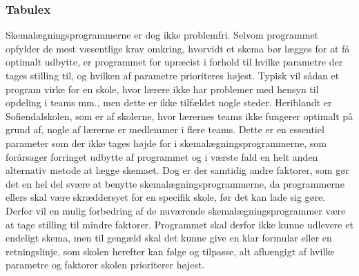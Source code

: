 \subsubsection{Tabulex}
Skemalægningsprogrammerne er dog ikke problemfri. Selvom programmet opfylder de mest væsentlige krav omkring, hvorvidt et skema bør lægges for at få optimalt udbytte, er programmet for upræcist i forhold til hvilke parametre der tages stilling til, og hvilken af parametre prioriteres højest. Typisk vil sådan et program virke for en skole, hvor lærere ikke har problemer med hensyn til opdeling i teams mm., men dette er ikke tilfældet nogle steder. Heriblandt er Sofiendalskolen, som er af skolerne, hvor lærernes teams ikke fungerer optimalt på grund af, nogle af lærerne er medlemmer i flere teams. Dette er en essentiel parameter som der ikke tages højde for i skemalægningsprogrammerne, som forårsager forringet udbytte af programmet og i værste fald en helt anden alternativ metode at lægge skemaet. Dog er der samtidig andre faktorer, som gør det en hel del svære at benytte skemalægningsprogrammerne, da programmerne ellers skal være skræddersyet for en specifik skole, før det kan lade sig gøre.
Derfor vil en mulig forbedring af de nuværende skemalægningsprogrammer være at tage stilling til mindre faktorer. Programmet skal derfor ikke kunne udlevere et endeligt skema, men til gengæld skal det kunne give en klar formular eller en retningslinje, som skolen herefter kan følge og tilpasse, alt afhængigt af hvilke parametre og faktorer skolen prioriterer højest\cite{biblop1:16}. 